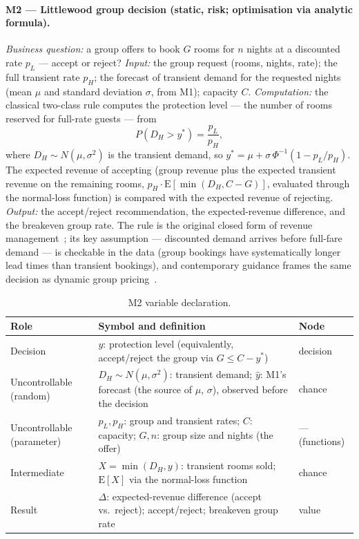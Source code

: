 \paragraph{M2 --- Littlewood group decision (static, risk; optimisation via analytic formula).}
\emph{Business question:} a group offers to book $G$ rooms for $n$ nights at a discounted rate $p_L$ --- accept or reject? \emph{Input:} the group request (rooms, nights, rate); the full transient rate $p_H$; the forecast of transient demand for the requested nights (mean $\mu$ and standard deviation $\sigma$, from M1); capacity $C$. \emph{Computation:} the classical two-class rule computes the protection level --- the number of rooms reserved for full-rate guests --- from
\begin{equation}
P(D_H > y^{*}) = \frac{p_L}{p_H},
\label{eq:m2rule}
\end{equation}
where $D_H \sim N(\mu, \sigma^2)$ is the transient demand, so $y^{*} = \mu + \sigma\,\Phi^{-1}(1 - p_L/p_H)$. The expected revenue of accepting (group revenue plus the expected transient revenue on the remaining rooms, $p_H \cdot \mathrm{E}[\min(D_H, C-G)]$, evaluated through the normal-loss function) is compared with the expected revenue of rejecting. \emph{Output:} the accept/reject recommendation, the expected-revenue difference, and the breakeven group rate. The rule is the original closed form of revenue management~\cite{littlewood2005}; its key assumption --- discounted demand arrives before full-fare demand --- is checkable in the data (group bookings have systematically longer lead times than transient bookings), and contemporary guidance frames the same decision as dynamic group pricing~\cite{amadeus2023}.

\begin{table}[H]
\centering
\caption{M2 variable declaration.}
\label{tab:m2vars}
\begin{tabularx}{0.92\textwidth}{@{}l X l@{}}
\toprule
\textbf{Role} & \textbf{Symbol and definition} & \textbf{Node} \\
\midrule
Decision & $y$: protection level (equivalently, accept/reject the group via $G \le C - y^{*}$) & decision \\
Uncontrollable (random) & $D_H \sim N(\mu, \sigma^2)$: transient demand; $\hat{y}$: M1's forecast (the source of $\mu$, $\sigma$), observed before the decision & chance \\
Uncontrollable (parameter) & $p_L, p_H$: group and transient rates; $C$: capacity; $G, n$: group size and nights (the offer) & --- (functions) \\
Intermediate & $X = \min(D_H, y)$: transient rooms sold; $\mathrm{E}[X]$ via the normal-loss function & chance \\
Result & $\Delta$: expected-revenue difference (accept vs.\ reject); accept/reject; breakeven group rate & value \\
\bottomrule
\end{tabularx}
\end{table}

